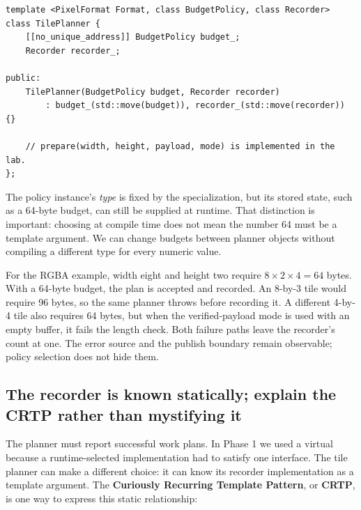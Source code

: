\begin{verbatim}
template <PixelFormat Format, class BudgetPolicy, class Recorder>
class TilePlanner {
    [[no_unique_address]] BudgetPolicy budget_;
    Recorder recorder_;

public:
    TilePlanner(BudgetPolicy budget, Recorder recorder)
        : budget_(std::move(budget)), recorder_(std::move(recorder)) {}

    // prepare(width, height, payload, mode) is implemented in the lab.
};
\end{verbatim}

The policy instance's \emph{type} is fixed by the specialization, but its stored state, such as a 64-byte budget, can still be supplied at runtime. That distinction is important: choosing  at compile time does not mean the number 64 must be a template argument. We can change budgets between planner objects without compiling a different type for every numeric value.

For the RGBA example, width eight and height two require \(8\times2\times4=64\) bytes. With a 64-byte budget, the plan is accepted and recorded. An 8-by-3 tile would require 96 bytes, so the same planner throws before recording it. A different 4-by-4 tile also requires 64 bytes, but when the verified-payload mode is used with an empty buffer, it fails the length check. Both failure paths leave the recorder's count at one. The error source and the publish boundary remain observable; policy selection does not hide them.

\subsection{The recorder is known statically; explain the CRTP rather than mystifying it}\label{05-engine-i-ch005-the-recorder-is-known-statically-explain-the-crtp-rather-than-mystifying-it}

\hypertarget{05-engine-i-ch005-the-recorder-is-known-statically-explain-the-crtp-rather-than-mystifying-it}{}

The planner must report successful work plans. In Phase 1 we used a virtual  because a runtime-selected implementation had to satisfy one interface. The tile planner can make a different choice: it can know its recorder implementation as a template argument. The \textbf{Curiously Recurring Template Pattern}, or \textbf{CRTP}, is one way to express this static relationship:

